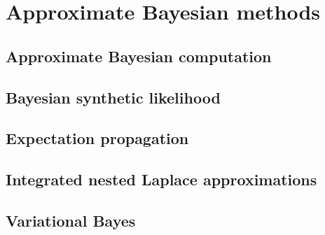 \chapter{Approximate Bayesian methods}\label{chap15}

\section{Approximate Bayesian computation}\label{sec15_1}

\section{Bayesian synthetic likelihood}\label{sec15_2}

\section{Expectation propagation}\label{sec15_3}

\section{Integrated nested Laplace approximations}\label{sec15_4}

\section{Variational Bayes}\label{sec15_5}



